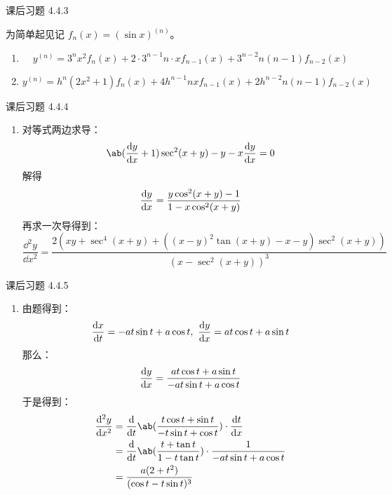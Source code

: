 \begin{problem}
	课后习题 4.4.3

	\begin{solution}
		为简单起见记 $f_n(x) = (\sin x)^{(n)}$。
		\begin{enumerate}
			\item[\textbf{1)}]
			$$
			y^{(n)} = 3^n x^2 f_n(x) + 2 \cdot 3^{n-1} n \cdot x f_{n-1}(x) + 3^{n-2} n(n-1) f_{n-2}(x) 
			$$
	
			\item[\textbf{2)}]
			$$
			y^{(n)} = h^n (2x^2 + 1) f_n(x) + 4 h^{n-1} n x f_{n-1}(x) + 2 h^{n-2} n(n-1) f_{n-2}(x)
			$$
		\end{enumerate}
	\end{solution}
\end{problem}

\begin{problem}
	课后习题 4.4.4

	\begin{solution}
		\begin{enumerate}
			\item[\textbf{1)}] 对等式两边求导：
			$$
			\ab(\dv{y}{x} + 1) \sec^2 (x + y) - y - x \dv{y}{x} = 0
			$$
			解得
			$$
			\dv{y}{x} = \frac{y \cos^2 (x + y) - 1}{1 - x \cos^2 (x + y)}
			$$
			再求一次导得到：
			$$
			\frac{\dd^2 y}{\dd x^2} = \frac {2\left (x y + \sec^4 (x + y) + \left ((x - y)^2\tan (x + y) - x - y \right)\sec^2 (x + y) \right)} {\left (x - \sec^2 (x + y) \right)^3}
			$$
		\end{enumerate}
	\end{solution}
\end{problem}

\begin{problem}
	课后习题 4.4.5

	\begin{solution}
		\begin{enumerate}
			\item[\textbf{2)}] 由题得到：
			$$
			\dv{x}{t} = -at \sin t + a \cos t,\ \dv{y}{x} = at \cos t + a \sin t
			$$
			那么：
			$$
			\dv{y}{x} = \frac{at \cos t + a \sin t}{-at \sin t + a \cos t}
			$$
			于是得到：
			$$
			\begin{aligned}
				\frac{\dd^2 y}{\dd x^2} & = \frac{\dd}{\dd t} \ab(\frac{t \cos t + \sin t}{-t \sin t + \cos t}) \cdot \dv{t}{x} \\
				& = \frac{\dd}{\dd t} \ab(\frac{t + \tan t}{1 - t \tan t}) \cdot \frac{1}{-at \sin t + a \cos t} \\
				& = \frac{a(2 + t^2)}{(\cos t - t \sin t)^3}
			\end{aligned}
			$$
		\end{enumerate}
	\end{solution}
\end{problem}

